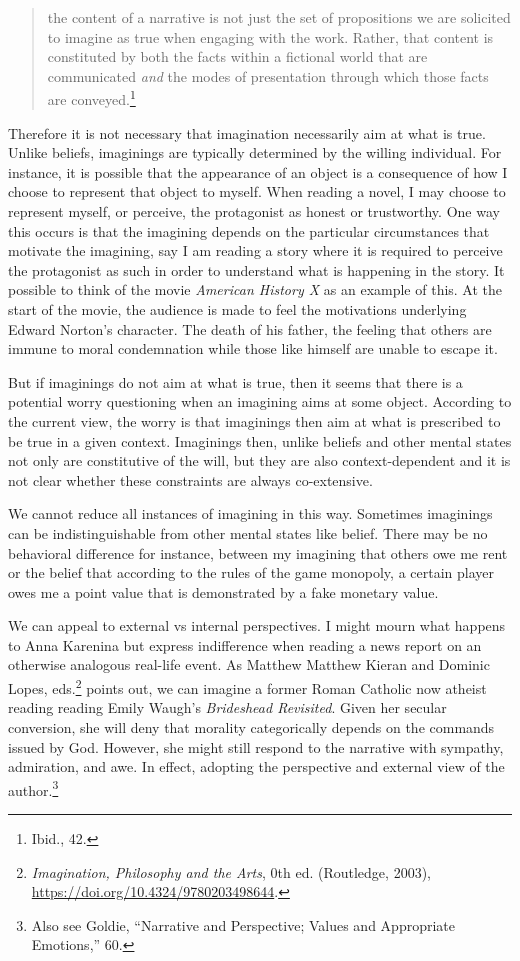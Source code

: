 \documentclass[phdthesis,12pt,final]{wuthesis}
\theoremstyle{definition}
\theoremstyle{definition}
\theoremstyle{definition}
\theoremstyle{definition}
\theoremstyle{remark}
\begin{document}
\begin{quote}
the content of a narrative is not just the set of propositions we are solicited to imagine as true when engaging with the work. Rather, that content is constituted by both the facts within a fictional world that are communicated \emph{and} the modes of presentation through which those facts are conveyed.\footnote{Ibid., 42.}
\end{quote}

Therefore it is not necessary that imagination necessarily aim at what is true. Unlike beliefs, imaginings are typically determined by the willing individual. For instance, it is possible that the appearance of an object is a consequence of how I choose to represent that object to myself. When reading a novel, I may choose to represent myself, or perceive, the protagonist as honest or trustworthy. One way this occurs is that the imagining depends on the particular circumstances that motivate the imagining, say I am reading a story where it is required to perceive the protagonist as such in order to understand what is happening in the story. It possible to think of the movie \emph{American History X} as an example of this. At the start of the movie, the audience is made to feel the motivations underlying Edward Norton's character. The death of his father, the feeling that others are immune to moral condemnation while those like himself are unable to escape it.

But if imaginings do not aim at what is true, then it seems that there is a potential worry questioning when an imagining aims at some object. According to the current view, the worry is that imaginings then aim at what is prescribed to be true in a given context. Imaginings then, unlike beliefs and other mental states not only are constitutive of the will, but they are also context-dependent and it is not clear whether these constraints are always co-extensive.

We cannot reduce all instances of imagining in this way. Sometimes imaginings can be indistinguishable from other mental states like belief. There may be no behavioral difference for instance, between my imagining that others owe me rent or the belief that according to the rules of the game monopoly, a certain player owes me a point value that is demonstrated by a fake monetary value.

We can appeal to external vs internal perspectives. I might mourn what happens to Anna Karenina but express indifference when reading a news report on an otherwise analogous real-life event. As Matthew Matthew Kieran and Dominic Lopes, eds.\footnote{\emph{Imagination, {Philosophy} and the {Arts}}, 0th ed. (Routledge, 2003), \url{https://doi.org/10.4324/9780203498644}.} points out, we can imagine a former Roman Catholic now atheist reading reading Emily Waugh's \emph{Brideshead Revisited}. Given her secular conversion, she will deny that morality categorically depends on the commands issued by God. However, she might still respond to the narrative with sympathy, admiration, and awe. In effect, adopting the perspective and external view of the author.\footnote{Also see Goldie, {``Narrative and {Perspective}; {Values} and {Appropriate Emotions},''} 60.}
\end{document}
